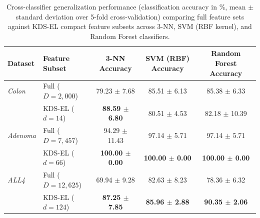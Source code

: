 \begin{table}[!htb]
\centering
\caption{Cross-classifier generalization performance (classification accuracy in \%, mean $\pm$ standard deviation over 5-fold cross-validation) comparing full feature sets against KDS-EL compact feature subsets across 3-NN, SVM (RBF kernel), and Random Forest classifiers.}
\label{T-S9}
\small
\setlength{\tabcolsep}{10pt}
\renewcommand{\arraystretch}{1.12}
\begin{tabular}{@{}llccc@{}}
\toprule
Dataset & Feature Subset & 3-NN Accuracy & SVM (RBF) Accuracy & Random Forest Accuracy \\
\midrule
\textit{Colon} & Full ($D = 2{,}000$) & 79.23 $\pm$ 7.68 & 85.51 $\pm$ 6.13 & 85.38 $\pm$ 6.33 \\
 & KDS-EL ($d = 14$) & \textbf{88.59 $\pm$ 6.80} & 80.51 $\pm$ 4.53 & 82.18 $\pm$ 10.39 \\
\midrule
\textit{Adenoma} & Full ($D = 7{,}457$) & 94.29 $\pm$ 11.43 & 97.14 $\pm$ 5.71 & 97.14 $\pm$ 5.71 \\
 & KDS-EL ($d = 66$) & \textbf{100.00 $\pm$ 0.00} & \textbf{100.00 $\pm$ 0.00} & \textbf{100.00 $\pm$ 0.00} \\
\midrule
\textit{ALL4} & Full ($D = 12{,}625$) & 69.94 $\pm$ 9.28 & 82.63 $\pm$ 8.23 & 78.36 $\pm$ 6.32 \\
 & KDS-EL ($d = 124$) & \textbf{87.25 $\pm$ 7.85} & \textbf{85.96 $\pm$ 2.88} & \textbf{90.35 $\pm$ 2.06} \\
\bottomrule
\end{tabular}
\end{table}
